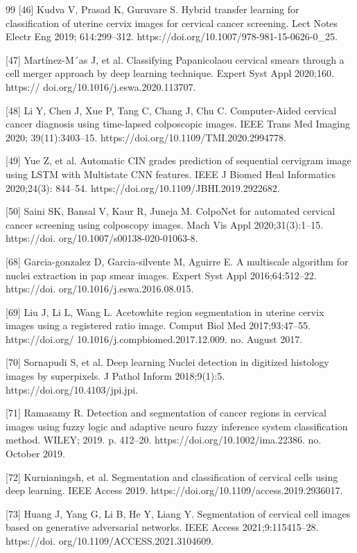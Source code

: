 \documentclass[final,5p,times,twocolumn,authoryear]{elsarticle}
\begin{document}
\begin{thebibliography}{99}
 [46] Kudva V, Prasad K, Guruvare S. Hybrid transfer learning for classification of uterine cervix images for cervical cancer screening. Lect Notes Electr Eng 2019; 614:299–312. https://doi.org/10.1007/978-981-15-0626-0_25.

 [47] Martínez-M´as J, et al. Classifying Papanicolaou cervical smears through a cell merger approach by deep learning technique. Expert Syst Appl 2020;160. https:// doi.org/10.1016/j.eswa.2020.113707.

 [48] Li Y, Chen J, Xue P, Tang C, Chang J, Chu C. Computer-Aided cervical cancer diagnosis using time-lapsed colposcopic images. IEEE Trans Med Imaging 2020; 39(11):3403–15. https://doi.org/10.1109/TMI.2020.2994778.

 [49] Yue Z, et al. Automatic CIN grades prediction of sequential cervigram image using LSTM with Multistate CNN features. IEEE J Biomed Heal Informatics 2020;24(3): 844–54. https://doi.org/10.1109/JBHI.2019.2922682.

 [50] Saini SK, Bansal V, Kaur R, Juneja M. ColpoNet for automated cervical cancer screening using colposcopy images. Mach Vis Appl 2020;31(3):1–15. https://doi. org/10.1007/s00138-020-01063-8.

 [68] Garcia-gonzalez D, Garcia-silvente M, Aguirre E. A multiscale algorithm for nuclei extraction in pap smear images. Expert Syst Appl 2016;64:512–22. https://doi. org/10.1016/j.eswa.2016.08.015.

 [69] Liu J, Li L, Wang L. Acetowhite region segmentation in uterine cervix images using a registered ratio image. Comput Biol Med 2017;93:47–55. https://doi.org/ 10.1016/j.compbiomed.2017.12.009. no. August 2017.

 [70] Sornapudi S, et al. Deep learning Nuclei detection in digitized histology images by superpixels. J Pathol Inform 2018;9(1):5. https://doi.org/10.4103/jpi.jpi.

 [71] Ramasamy R. Detection and segmentation of cancer regions in cervical images using fuzzy logic and adaptive neuro fuzzy inference system classification method. WILEY; 2019. p. 412–20. https://doi.org/10.1002/ima.22386. no. October 2019.

[72] Kurnianingsh, et al. Segmentation and classification of cervical cells using deep learning. IEEE Access 2019. https://doi.org/10.1109/access.2019.2936017.

[73] Huang J, Yang G, Li B, He Y, Liang Y. Segmentation of cervical cell images based
on generative adversarial networks. IEEE Access 2021;9:115415–28. https://doi. org/10.1109/ACCESS.2021.3104609.


\end{thebibliography}
\end{document}

